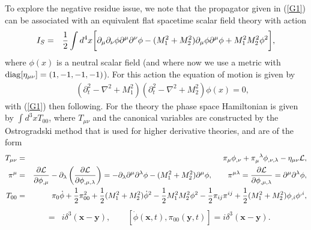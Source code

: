 \documentclass[aps]{revtex4}
\begin{document}
To explore the negative residue issue, we note that the propagator given in (\ref{G1}) can be associated with an equivalent flat spacetime scalar field theory with action
%
\begin{eqnarray}
I_S&=&\frac{1}{2}\int d^4x\bigg{[}\partial_{\mu}\partial_{\nu}\phi\partial^{\mu}
\partial^{\nu}\phi -(M_1^2+M_2^2)\partial_{\mu}\phi\partial^{\mu}\phi+M_1^2M_2^2\phi^2\bigg{]},
\label{G5}
\end{eqnarray}
%
where $\phi(x)$ is a neutral scalar field (and where now we use a metric with ${\rm diag}[\eta_{\mu\nu}]=(1,-1,-1,-1)$). For this action the equation of motion is given by
%
\begin{eqnarray}
&&(\partial_t^2-\nabla^2+M_1^2)(\partial_t^2-\nabla^2+M_2^2)\phi(x)=0,
\label{G6}
\end{eqnarray}
%
with (\ref{G1}) then following. For the theory the phase space Hamiltonian is given by $\int d^3x T_{00}$, where $T_{\mu\nu}$ and the canonical variables are constructed by the Ostrogradski method that is used for higher derivative theories, and are of the form 
%
\begin{eqnarray}
T_{\mu\nu}&=&\pi_{\mu}\phi_{,\nu}+\pi_{\mu}^{\phantom{\mu}\lambda}\phi_{,\nu,\lambda}-\eta_{\mu\nu}{\cal L},
\nonumber\\ 
 \pi^{\mu}&=&\frac{\partial{\cal L}}{\partial \phi_{,\mu}}-\partial_{\lambda
}\left(\frac{\partial {\cal L}}{\partial\phi_{,\mu,\lambda}}\right)=-\partial_{\lambda}\partial^{\mu}\partial^{\lambda}\phi- (M_1^2+M_2^2)\partial^{\mu}\phi,
\qquad \pi^{\mu\lambda}=\frac{\partial {\cal L}}{\partial \phi_{,\mu,\lambda}}=\partial^{\mu}\partial^{\lambda}\phi,
\nonumber\\
T_{00}&=&\pi_{0}\dot{\phi}+\frac{1}{2}\pi_{00}^2+\frac{1}{2}(M_1^2+M_2^2)\dot{
\phi}^2-\frac{1}{2}M_1^2M_2^2\phi^2
-\frac{1}{2}\pi_{ij}\pi^{ij}+\frac{1}{2}(M_1^2+M_2^2)\phi_{,i}\phi^{,i},
\label{G7}
\end{eqnarray}
%
%
\begin{eqnarray}
[\phi(\textbf{x},t),\pi_0(\textbf{y},t)]&=&i\delta^3(\textbf{x}-\textbf{y}),\qquad [\dot{\phi}(\textbf{x},t),\pi_{00}(\textbf{y},t)]=i\delta^3(\textbf{x}-\textbf{y}).
\label{G8}
\end{eqnarray}
%
\end{document}
